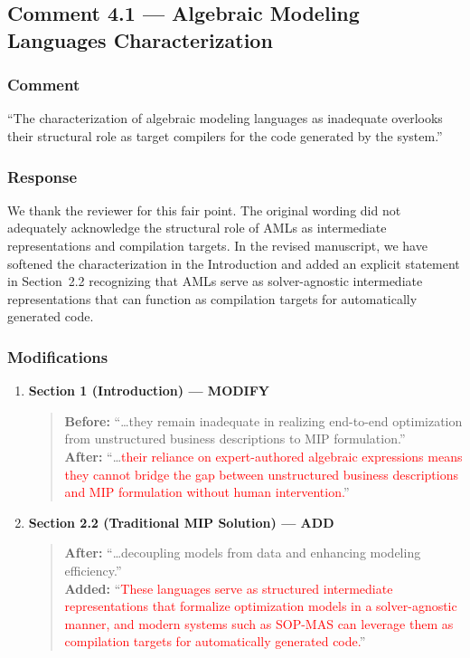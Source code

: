 \documentclass[11pt,a4paper]{article}
\begin{document}
\subsection{Comment 4.1 --- Algebraic Modeling Languages Characterization}

\subsubsection{Comment}
``The characterization of algebraic modeling languages as inadequate overlooks their structural role as target compilers for the code generated by the system.''

\subsubsection{Response}
We thank the reviewer for this fair point. The original wording did not adequately acknowledge the structural role of AMLs as intermediate representations and compilation targets. In the revised manuscript, we have softened the characterization in the Introduction and added an explicit statement in Section~2.2 recognizing that AMLs serve as solver-agnostic intermediate representations that can function as compilation targets for automatically generated code.

\subsubsection{Modifications}
\begin{enumerate}
\item \textbf{Section 1 (Introduction) --- MODIFY}
\begin{quote}
\textbf{Before:} ``\ldots they remain inadequate in realizing end-to-end optimization from unstructured business descriptions to MIP formulation.''\\[4pt]
\textbf{After:} ``\ldots \textcolor{red}{their reliance on expert-authored algebraic expressions means they cannot bridge the gap between unstructured business descriptions and MIP formulation without human intervention.}''
\end{quote}
\item \textbf{Section 2.2 (Traditional MIP Solution) --- ADD}
\begin{quote}
\textbf{After:} ``\ldots decoupling models from data and enhancing modeling efficiency.''\\[4pt]
\textbf{Added:} ``\textcolor{red}{These languages serve as structured intermediate representations that formalize optimization models in a solver-agnostic manner, and modern systems such as SOP-MAS can leverage them as compilation targets for automatically generated code.}''
\end{quote}
\end{enumerate}
\end{document}
